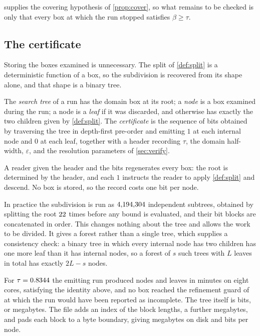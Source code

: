 \documentclass[a4paper,UKenglish,cleveref,autoref,thm-restate,numberwithinsect]{lipics-v2021}
\begin{document}
 supplies the covering hypothesis of \cref{prop:cover}, so
what remains to be checked is only that every box at which the run stopped
satisfies $\beta\ge\tau$.

\subsection{The certificate}

Storing the boxes examined is unnecessary. The split of \cref{def:split} is a
deterministic function of a box, so the subdivision is recovered from its shape
alone, and that shape is a binary tree.

\begin{definition}
\label{def:certificate}
The \emph{search tree} of a run has the domain box at its root; a
\emph{node} is a box examined during the run; a node is a \emph{leaf} if it was
discarded, and otherwise has exactly the two children given by
\cref{def:split}. The \emph{certificate} is the sequence of bits obtained by
traversing the tree in depth-first pre-order and emitting $1$ at each internal
node and $0$ at each leaf, together with a header recording $\tau$, the domain
half-width, $\varepsilon$, and the resolution parameters of \cref{sec:verify}.
\end{definition}

A reader given the header and the bits regenerates every box: the root is
determined by the header, and each $1$ instructs the reader to apply
\cref{def:split} and descend. No box is stored, so the record costs one bit per
node.

In practice the subdivision is run as $4{,}194{,}304$ independent subtrees, obtained by
splitting the root $22$ times before any bound is evaluated, and their
bit blocks are concatenated in order. This changes nothing about the tree and
allows the work to be divided. It gives a forest rather than a single tree, which
supplies a consistency check: a binary tree in which every internal node has two
children has one more leaf than it has internal nodes, so a forest of $s$ such
trees with $L$ leaves in total has exactly $2L-s$ nodes.

For $\tau=0.8344$ the emitting run produced \Nodes{} nodes and \Leaves{}
leaves in \EmitMinutes{} minutes on eight cores, satisfying the identity above,
and no box reached the refinement guard of \Hmin{} at which the run would have
been reported as incomplete. The tree itself is \Nodes{} bits, or \TreeMB{}
megabytes. The file adds an index of the \NSeed{} block lengths, a further
\BlockIndexMB{} megabytes, and pads each block to a byte boundary, giving
\CertMB{} megabytes on disk and \BitsPerNode{} bits per node.
\end{document}
